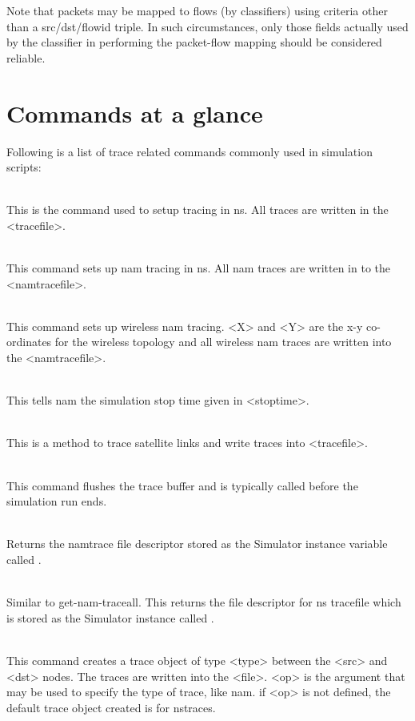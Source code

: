 Note that packets may be mapped to flows (by classifiers) using
criteria other than a src/dst/flowid triple.
In such circumstances, only those fields actually used by
the classifier in performing the packet-flow mapping should be
considered reliable.


\section{Commands at a glance}
\label{sec:tracecommand}

Following is a list of trace related commands commonly used in
simulation scripts:
\begin{flushleft}
\\
This is the command used to setup tracing in ns. All traces are written in
the <tracefile>.


\\
This command sets up nam tracing in ns. All nam traces are written in to
the <namtracefile>.


\\
This command sets up wireless nam tracing. <X> and <Y> are the x-y co-ordinates
for the wireless topology and all wireless nam traces are written  into
the <namtracefile>.


\\
This tells nam the simulation stop time  given in <stoptime>.


\\
This is a method to trace satellite links and write traces into <tracefile>.


\\
This command flushes the trace buffer and is typically called before the
simulation run ends.


\\
Returns the namtrace file descriptor stored as the Simulator instance
variable called .


\\
Similar to get-nam-traceall. This returns the file descriptor for ns tracefile
which is stored as the Simulator instance called .


\\
This command creates a trace object of type <type> between the <src> and
<dst> nodes. The traces are written into the <file>. <op> is the argument
that may be used to specify the type of trace, like nam. if <op> is not
defined, the default trace object created is for nstraces.



\end{flushleft}
